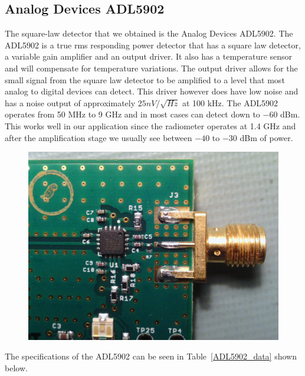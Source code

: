 \subsection{Analog Devices ADL5902}

The square-law detector that we obtained is the Analog Devices ADL5902.  The ADL5902 is a true rms responding power detector that has a square law detector, a variable gain amplifier and an output driver. It also has a temperature sensor and will compensate for temperature variations.  The output driver allows for the small signal from the square law detector to be amplified to a level that most analog to digital devices can detect.  This driver however does have low noise and has a noise output of approximately $25nV/ \sqrt{Hz}$ at 100 kHz.  The ADL5902 operates from 50 MHz to 9 GHz and in most cases can detect down to $-60$ dBm.  This works well in our application since the radiometer operates at 1.4 GHz and after the amplification stage we usually see between $-40$ to $-30$ dBm of power.  

{\begin{figure}[h!tb] \centering
\includegraphics[width=\textwidth]{Images/adl5902.jpg}
\label{ADL5902}
\end{figure}
}

The specifications of the ADL5902 can be seen in Table~\ref{ADL5902_data} shown below.

